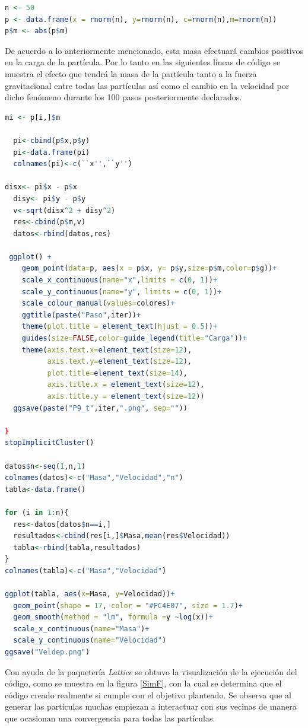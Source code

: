 \documentclass[12pt, letterpaper] {article}
\begin{document}
\begin{lstlisting}[language=R]
n <- 50
p <- data.frame(x = rnorm(n), y=rnorm(n), c=rnorm(n),m=rnorm(n))
p$m <- abs(p$m)
\end{lstlisting}


De acuerdo a lo anteriormente mencionado, esta masa efectuará cambios positivos en la carga de la partícula. Por lo tanto en las siguientes líneas de código se muestra el efecto que tendrá la masa de la partícula tanto a la fuerza gravitacional entre todas las partículas así como el cambio en la velocidad por dicho fenómeno durante los 100 pasos posteriormente declarados.

\begin{lstlisting}[language=R]
  mi <- p[i,]$m 
  
  pi<-cbind(p$x,p$y)
  pi<-data.frame(pi)
  colnames(pi)<-c(``x'',``y'')

disx<- pi$x - p$x
  disy<- pi$y - p$y
  v<-sqrt(disx^2 + disy^2)
  res<-cbind(p$m,v)
  datos<-rbind(datos,res)

 ggplot() +
    geom_point(data=p, aes(x = p$x, y= p$y,size=p$m,color=p$g))+
    scale_x_continuous(name="x",limits = c(0, 1))+
    scale_y_continuous(name="y", limits = c(0, 1))+
    scale_colour_manual(values=colores)+  
    ggtitle(paste("Paso",iter))+
    theme(plot.title = element_text(hjust = 0.5))+
    guides(size=FALSE,color=guide_legend(title="Carga"))+
    theme(axis.text.x=element_text(size=12),
          axis.text.y=element_text(size=12),
          plot.title=element_text(size=14),
          axis.title.x = element_text(size=12),
          axis.title.y = element_text(size=12))
  ggsave(paste("P9_t",iter,".png", sep=""))
  
}
stopImplicitCluster()

datos$n<-seq(1,n,1)
colnames(datos)<-c("Masa","Velocidad","n")
tabla<-data.frame()

for (i in 1:n){
  res<-datos[datos$n==i,]
  resultados<-cbind(res[i,]$Masa,mean(res$Velocidad))
  tabla<-rbind(tabla,resultados)
}
colnames(tabla)<-c("Masa","Velocidad")

ggplot(tabla, aes(x=Masa, y=Velocidad))+
  geom_point(shape = 17, color = "#FC4E07", size = 1.7)+
  geom_smooth(method = "lm", formula =y ~log(x))+
  scale_x_continuous(name="Masa")+
  scale_y_continuous(name="Velocidad")
ggsave("Veldep.png")\end{lstlisting}


Con ayuda de la paquetería \textit{Lattice} se obtuvo la visualización de la ejecución del código, como se muestra en la figura \ref{SimF}, con la cual se determina que el código creado realmente si cumple con el objetivo planteado. Se observa que al generar las partículas muchas empiezan a interactuar con sus vecinas de manera que ocasionan una convergencia para todas las partículas.
\end{document}
